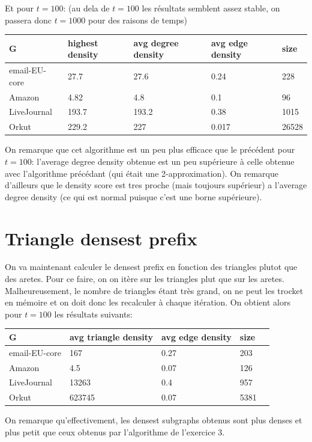 \documentclass{report}
\begin{document}
Et pour $t = 100$: (au dela de $t = 100$ les résultats semblent assez stable, on passera donc $t = 1000$ pour des raisons de temps)
\begin{center}
  \begin{tabular}{|l|l|l|l|l|}
    \hline
    G & highest density & avg degree density & avg edge density & size\\
    \hline
    email-EU-core & 27.7 & 27.6 & 0.24 & 228 \\
    Amazon & 4.82 & 4.8 & 0.1 & 96 \\
    LiveJournal & 193.7 & 193.2 & 0.38 & 1015 \\
    Orkut & 229.2 & 227 & 0.017 & 26528 \\
    \hline
  \end{tabular}
\end{center}

On remarque que cet algorithme est un peu plus efficace que le précédent pour $t = 100$: l'average degree density obtenue est un peu supérieure à celle obtenue avec l'algorithme précédant (qui était une 2-approximation). On remarque d'ailleurs que le density score est tres proche (mais toujours supérieur) a l'average degree density (ce qui est normal puisque c'est une borne supérieure).

\section{Triangle densest prefix}
On va maintenant calculer le densest prefix en fonction des triangles plutot que des aretes. Pour ce faire, on on itère sur les triangles plut que sur les aretes. Malheureusement, le nombre de triangles étant très grand, on ne peut les trocket en mémoire et on doit donc les recalculer à chaque itération. On obtient alors pour $t = 100$ les résultats suivants:
\begin{center}
  \begin{tabular}{|l|l|l|l|l|}
    \hline
    G & avg triangle density & avg edge density & size\\
    \hline
    email-EU-core & 167 & 0.27 & 203\\
    Amazon & 4.5 & 0.07 & 126\\
    LiveJournal & 13263 & 0.4 & 957\\
    Orkut & 623745 & 0.07 & 5381 \\
    \hline
  \end{tabular}
\end{center}
On remarque qu'effectivement, les densest subgraphs obtenus sont plus denses et plus petit que ceux obtenus par l'algorithme de l'exercice 3.
\end{document}
